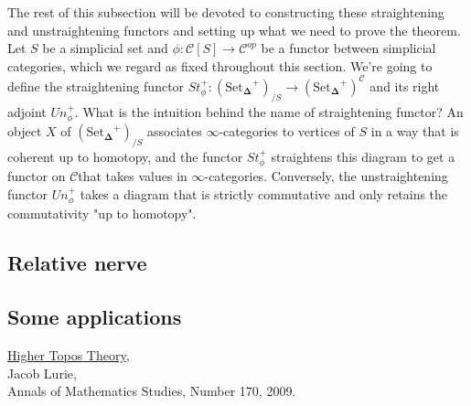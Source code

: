 \documentclass{amsart}
\newcommand{\8}{\ensuremath{\infty}}
\newcommand{\C}{\ensuremath{\mathscr{C}}}
\newcommand{\SSet}{\ensuremath{\text{Set}_{\boldsymbol{\Delta}}}}
\begin{document}
The rest of this subsection will be devoted to constructing these straightening and unstraightening functors and setting up what we need to prove the theorem.\\
Let $S$ be a simplicial set and $\phi:\mathscr{C}[S]\rightarrow \mathcal{C}^{op}$ be a functor between simplicial categories, which we regard as fixed throughout this section. We're going to define the straightening functor $St_\phi^+:(\SSet^+)_{/S}\rightarrow (\SSet^+)^\C$ and its right adjoint $Un_\phi^+$. What is the intuition behind the name of straightening functor? An object $X$ of $(\SSet^+)_{/S}$ associates \8-categories to vertices of $S$ in a way that is coherent up to homotopy, and the functor $St_\phi^+$ straightens this diagram to get a functor on \C that takes values in \8-categories. Conversely, the unstraightening functor $Un_\phi^+$ takes a diagram that is strictly commutative and only retains the commutativity "up to homotopy".

\subsection{Relative nerve}
\subsection{Some applications}


\begin{thebibliography}{99}
  \href{https://arxiv.org/abs/math/0608040}{Higher Topos Theory}, \\
  Jacob Lurie, \\
  Annals of Mathematics Studies, Number 170, 2009.
\end{thebibliography}
\end{document}
